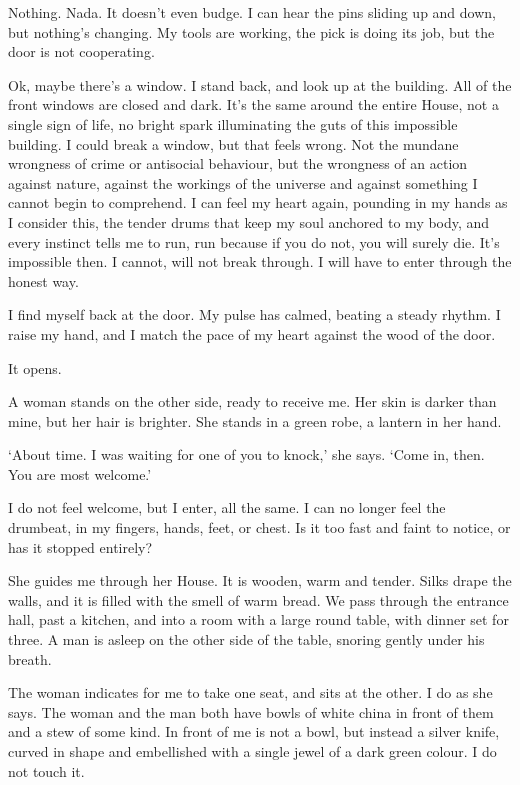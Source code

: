 Nothing. Nada. It doesn't even budge. I can hear the pins sliding up
and down, but nothing's changing. My tools are working, the pick is
doing its job, but the door is not cooperating.

Ok, maybe there's a window. I stand back, and look up at the
building. All of the front windows are closed and dark. It's the same
around the entire House, not a single sign of life, no bright spark
illuminating the guts of this impossible building. I could break a
window, but that feels wrong. Not the mundane wrongness of crime or
antisocial behaviour, but the wrongness of an action against nature,
against the workings of the universe and against something I cannot
begin to comprehend. I can feel my heart again, pounding in my hands
as I consider this, the tender drums that keep my soul anchored to my
body, and every instinct tells me to run, run because if you do not,
you will surely die. It's impossible then. I cannot, will not break
through. I will have to enter through the honest way.

I find myself back at the door. My pulse has calmed, beating a steady
rhythm. I raise my hand, and I match the pace of my heart against the
wood of the door.

It opens.

A woman stands on the other side, ready to receive me. Her skin is
darker than mine, but her hair is brighter. She stands in a green
robe, a lantern in her hand.

`About time. I was waiting for one of you to knock,' she says. `Come
in, then. You are most welcome.'

I do not feel welcome, but I enter, all the same. I can no longer feel
the drumbeat, in my fingers, hands, feet, or chest. Is it too fast and
faint to notice, or has it stopped entirely?

She guides me through her House. It is wooden, warm and tender. Silks
drape the walls, and it is filled with the smell of warm bread. We
pass through the entrance hall, past a kitchen, and into a room with a
large round table, with dinner set for three. A man is asleep on the
other side of the table, snoring gently under his breath.

The woman indicates for me to take one seat, and sits at the other. I
do as she says. The woman and the man both have bowls of white china
in front of them and a stew of some kind. In front of me is not a bowl,
but instead a silver knife, curved in shape and embellished with a
single jewel of a dark green colour. I do not touch it.

